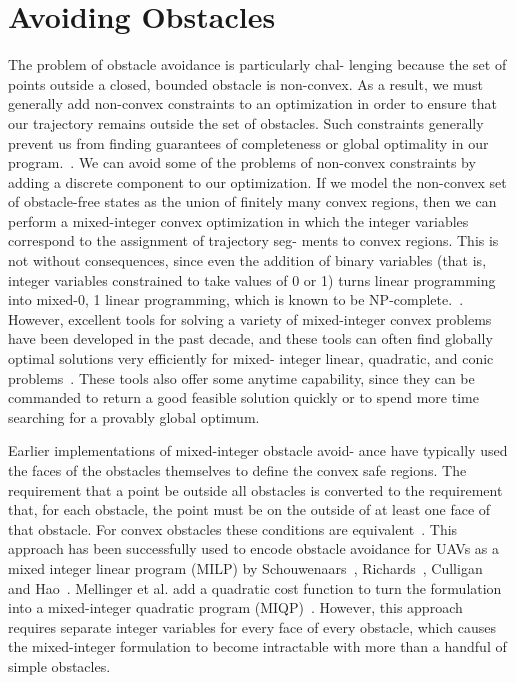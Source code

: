 \section{Avoiding Obstacles}
The problem of obstacle avoidance is particularly chal-
lenging because the set of points outside a closed, bounded
obstacle is non-convex. As a result, we must generally add
non-convex constraints to an optimization in order to ensure
that our trajectory remains outside the set of obstacles. Such
constraints generally prevent us from finding guarantees of
completeness or global optimality in our program.~\cite{boyd2004convex}. We
can avoid some of the problems of non-convex constraints
by adding a discrete component to our optimization. If we model the non-convex set of obstacle-free states as the
union of finitely many convex regions, then we can perform
a mixed-integer convex optimization in which the integer
variables correspond to the assignment of trajectory seg-
ments to convex regions. This is not without consequences,
since even the addition of binary variables (that is, integer
variables constrained to take values of 0 or 1) turns linear
programming into mixed-{0, 1} linear programming, which
is known to be NP-complete.~\cite{karp2010reducibility}. However, excellent tools
for solving a variety of mixed-integer convex problems have
been developed in the past decade, and these tools can often
find globally optimal solutions very efficiently for mixed-
integer linear, quadratic, and conic problems~\cite{optimization2014gurobi,aps2014mosek,ilog2010cplex}. These tools also offer some anytime capability, since they can
be commanded to return a good feasible solution quickly or
to spend more time searching for a provably global optimum.

\par Earlier implementations of mixed-integer obstacle avoid-
ance have typically used the faces of the obstacles themselves
to define the convex safe regions. The requirement that a
point be outside all obstacles is converted to the requirement
that, for each obstacle, the point must be on the outside
of at least one face of that obstacle. For convex obstacles
these conditions are equivalent~\cite{mellinger2012mixed}. This approach has been successfully used to encode obstacle avoidance for UAVs as a
mixed integer linear program (MILP) by Schouwenaars~\cite{schouwenaars2001mixed}, Richards~\cite{richardsco}, Culligan~\cite{culligan2006online} and Hao~\cite{hao2005differential}. Mellinger et al.
add a quadratic cost function to turn the formulation into a
mixed-integer quadratic program (MIQP)~\cite{mellinger2012mixed}. However, this
approach requires separate integer variables for every face of
every obstacle, which causes the mixed-integer formulation
to become intractable with more than a handful of simple
obstacles.

